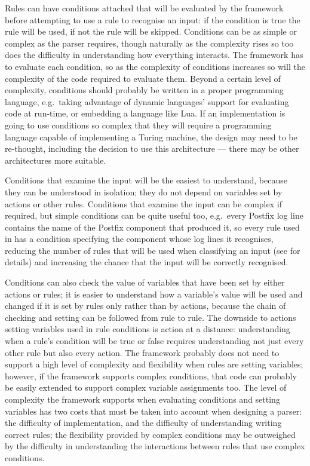 Rules can have conditions attached that will be evaluated by the framework
before attempting to use a rule to recognise an input: if the condition is
true the rule will be used, if not the rule will be skipped.  Conditions
can be as simple or complex as the parser requires, though naturally as the
complexity rises so too does the difficulty in understanding how everything
interacts.  The framework has to evaluate each condition, so as the
complexity of conditions increases so will the complexity of the code
required to evaluate them.  Beyond a certain level of complexity,
conditions should probably be written in a proper programming language,
e.g.\ taking advantage of dynamic languages' support for evaluating code at
run-time, or embedding a language like Lua.  If an implementation is going
to use conditions so complex that they will require a programming language
capable of implementing a Turing machine, the design may need to be
re-thought, including the decision to use this architecture --- there may
be other architectures more suitable.

Conditions that examine the input will be the easiest to understand,
because they can be understood in isolation; they do not depend on
variables set by actions or other rules.  Conditions that examine the input
can be complex if required, but simple conditions can be quite useful too,
e.g.\ every Postfix log line contains the name of the Postfix component
that produced it, so every rule used in \parsername{} has a condition
specifying the component whose log lines it recognises, reducing the number
of rules that will be used when classifying an input (see  for details) and increasing the chance that the input
will be correctly recognised.

Conditions can also check the value of variables that have been set by
either actions or rules; it is easier to understand how a variable's value
will be used and changed if it is set by rules only rather than by actions,
because the chain of checking and setting can be followed from rule to
rule.  The downside to actions setting variables used in rule conditions is
action at a distance: understanding when a rule's condition will be true or
false requires understanding not just every other rule but also every
action.  The framework probably does not need to support a high level of
complexity and flexibility when rules are setting variables; however, if
the framework supports complex conditions, that code can probably be easily
extended to support complex variable assignments too.  The level of
complexity the framework supports when evaluating conditions and setting
variables has two costs that must be taken into account when designing a
parser: the difficulty of implementation, and the difficulty of
understanding writing correct rules; the flexibility provided by complex
conditions may be outweighed by the difficulty in understanding the
interactions between rules that use complex conditions.


